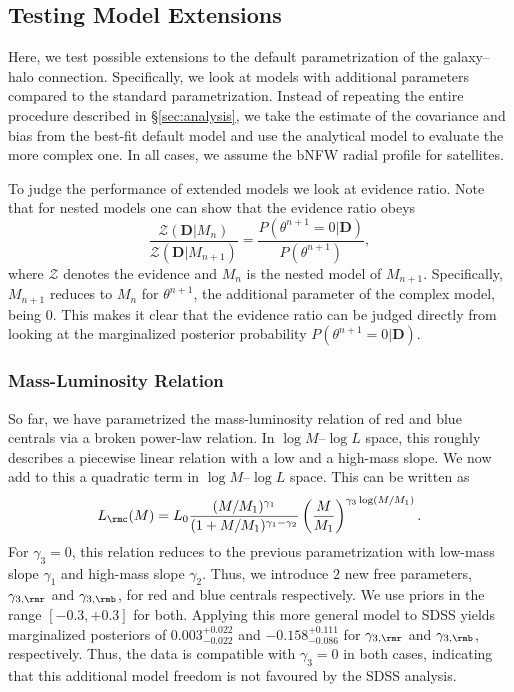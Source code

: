 \documentclass[fleqn,usenatbib,useAMS]{mnras}
\begin{document}
\subsection{Testing Model Extensions}

Here, we test possible extensions to the default parametrization of the galaxy--halo connection. Specifically, we look at models with additional parameters compared to the standard parametrization. Instead of repeating the entire procedure described in \S \ref{sec:analysis}, we take the estimate of the covariance and bias from the best-fit default model and use the analytical model to evaluate the more complex one. In all cases, we assume the bNFW radial profile for satellites.

To judge the performance of extended models we look at evidence ratio. Note that for nested models one can show that the evidence ratio obeys
\begin{equation}
\frac{\mathcal{Z}(\boldsymbol{D} | M_{n})}{\mathcal{Z}(\boldsymbol{D} | M_{n + 1})} = \frac{P(\theta^{n + 1} = 0 | \boldsymbol{D})}{P(\theta^{n + 1})},
\end{equation}
where $\mathcal{Z}$ denotes the evidence and $M_n$ is the nested model of $M_{n + 1}$. Specifically, $M_{n + 1}$ reduces to $M_n$ for $\theta^{n + 1}$, the additional parameter of the complex model, being $0$. This makes it clear that the evidence ratio can be judged directly from looking at the marginalized posterior probability $P(\theta^{n + 1} = 0 | \boldsymbol{D})$.

\subsubsection{Mass-Luminosity Relation}

So far, we have parametrized the mass-luminosity relation of red and blue centrals via a broken power-law relation. In $\log M$--$\log L$ space, this roughly describes a piecewise linear relation with a low and a high-mass slope. We now add to this a quadratic term in $\log M$--$\log L$ space. This can be written as
\begin{equation}
L_\rmc (M) = L_0 \frac{(M / M_1)^{\gamma_1}}{(1 + M / M_1)^{\gamma_1 - \gamma_2}} \left( \frac{M}{M_1} \right)^{\gamma_3 \log (M / M_1)}.
\end{equation}
For $\gamma_3 = 0$, this relation reduces to the previous parametrization with low-mass slope $\gamma_1$ and high-mass slope $\gamma_2$. Thus, we introduce $2$ new free parameters, $\gamma_{3, \rmr}$ and $\gamma_{3, \rmb}$, for red and blue centrals respectively. We use priors in the range $[-0.3, +0.3]$ for both. Applying this more general model to SDSS yields marginalized posteriors of $0.003_{-0.022}^{+0.022}$ and $-0.158_{-0.086}^{+0.111}$ for $\gamma_{3, \rmr}$ and $\gamma_{3, \rmb}$, respectively. Thus, the data is compatible with $\gamma_3 = 0$ in both cases, indicating that this additional model freedom is not favoured by the SDSS analysis.
\end{document}
